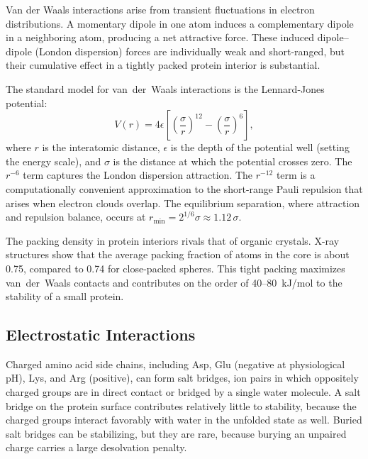 Van der Waals interactions arise from transient fluctuations in electron distributions.  A momentary dipole in one atom induces a complementary dipole in a neighboring atom, producing a net attractive force.  These induced dipole--dipole (London dispersion) forces are individually weak and short-ranged, but their cumulative effect in a tightly packed protein interior is substantial.

The standard model for van~der~Waals interactions is the Lennard-Jones potential:
\begin{equation}
  V(r) = 4\epsilon\left[\left(\frac{\sigma}{r}\right)^{12} - \left(\frac{\sigma}{r}\right)^{6}\right],
  \label{eq:lennard-jones}
\end{equation}
where $r$ is the interatomic distance, $\epsilon$ is the depth of the potential well (setting the energy scale), and $\sigma$ is the distance at which the potential crosses zero.  The $r^{-6}$ term captures the London dispersion attraction.  The $r^{-12}$ term is a computationally convenient approximation to the short-range Pauli repulsion that arises when electron clouds overlap.  The equilibrium separation, where attraction and repulsion balance, occurs at $r_{\min} = 2^{1/6}\sigma \approx 1.12\,\sigma$.

The packing density in protein interiors rivals that of organic crystals.  X-ray structures show that the average packing fraction of atoms in the core is about 0.75, compared to 0.74 for close-packed spheres.  This tight packing maximizes van~der~Waals contacts and contributes on the order of 40--80~kJ/mol to the stability of a small protein.

\subsection{Electrostatic Interactions}
\label{sec:electrostatic}

Charged amino acid side chains, including Asp, Glu (negative at physiological pH), Lys, and Arg (positive), can form salt bridges, ion pairs in which oppositely charged groups are in direct contact or bridged by a single water molecule.  A salt bridge on the protein surface contributes relatively little to stability, because the charged groups interact favorably with water in the unfolded state as well.  Buried salt bridges can be stabilizing, but they are rare, because burying an unpaired charge carries a large desolvation penalty.

